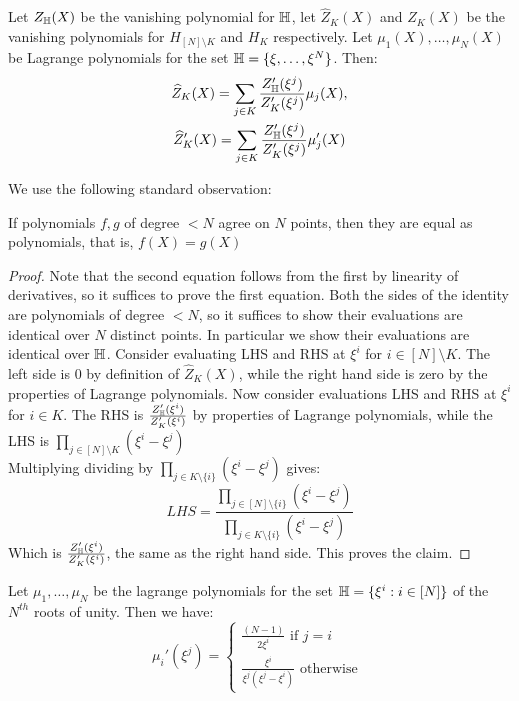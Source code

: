 \begin{lemma}\label{lem:zk-hat}
Let $Z_{\mathbb{H}}(X)$ be the vanishing polynomial for $\mathbb{H}$, let $\widehat{Z}_K(X)$ and  $Z_K(X)$ be the vanishing polynomials for $H_{[N]\setminus K}$ and $H_K$ respectively.
Let $\mu_1(X),\ldots,\mu_N(X)$ be Lagrange polynomials for the set $\mathbb{H}=\{\xi,\ldots,\xi^N\}$. Then:
\begin{gather}
    \widehat{Z}_K(X) = \sum_{j\in K}\frac{Z_{\mathbb{H}}'(\xi^j)}{Z_K'(\xi^j)}\mu_j(X), \\
    \widehat{Z}_K'(X)= \sum_{j\in K}\frac{Z_{\mathbb{H}}'(\xi^j)}{Z_K'(\xi^j)}\mu_j'(X)
\end{gather}
\end{lemma}
We use the following standard observation:
\begin{fact}
    If polynomials $f,g$ of degree $<N$ agree on $N$ points, then they are equal as polynomials, that is, $f(X)=g(X)$
\end{fact}

\begin{proof}
    Note that the second equation follows from the first by linearity of derivatives, so it suffices to prove the first equation.
    Both the sides of the identity are polynomials of degree $<N$, so it suffices to show their evaluations are identical over $N$ distinct points.
    In particular we show their evaluations are identical over $\mathbb{H}$.
    Consider evaluating LHS and RHS at $\xi^i$ for $i \in [N]\setminus K$.
    The left side is $0$ by definition of $\hat{Z}_K(X)$, while the right hand side is zero by the properties of Lagrange polynomials.
    Now consider evaluations LHS and RHS at $\xi^i$ for $i \in K$.
    The RHS is $\frac{Z_{\mathbb{H}}'(\xi^i)}{Z_K'(\xi^i)}$ by properties of Lagrange polynomials, while the
    LHS is $\prod_{j \in [N]\setminus K} (\xi^i-\xi^j)$\\
    Multiplying dividing by $\prod_{ j \in K \setminus \{i\}}(\xi^i-\xi^j)$ gives:
    $$LHS = \frac{\prod_{j \in [N] \setminus \{i\}} (\xi^i-\xi^j)}{\prod_{j \in K \setminus \{i\}}(\xi^i-\xi^j)}$$
    Which is $\frac{Z_{\mathbb{H}}'(\xi^i)}{Z_K'(\xi^i)}$, the same as the right hand side.
    This proves the claim.
\end{proof}

\begin{lemma}\label{lem:lamda-deriv}
Let $\mu_1,\ldots,\mu_N$ be the lagrange polynomials for the set $\mathbb{H}=\{\xi^i:i\in [N]\}$
of the $N^{th}$ roots of unity. Then we have:
\begin{equation*}
    \mu_i'(\xi^j) = \begin{cases}
                        \frac{(N-1)}{2\xi^{i}}  \text{ if } j=i\\
                        \frac{\xi^i}{\xi^j(\xi^j-\xi^i)} \text{ otherwise }
    \end{cases}
\end{equation*}
\end{lemma}

